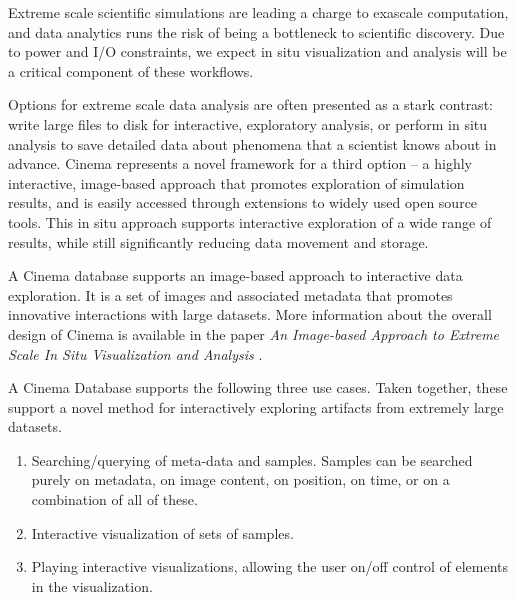 \label{sec:cinema}

Extreme scale scientific simulations are leading a charge to exascale computation, and data analytics runs the risk of being a bottleneck to scientific discovery. Due to power and I/O constraints, we expect in situ visualization and analysis will be a critical component of these workflows. 

Options for extreme scale data analysis are often presented as a stark contrast: write large files to disk for interactive, exploratory analysis, or perform in situ analysis to save detailed data about phenomena that a scientist knows about in advance. Cinema represents a novel framework for a third option – a highly interactive, image-based approach that promotes exploration of simulation results, and is easily accessed through extensions to widely used open source tools. This in situ approach supports interactive exploration of a wide range of results, while still significantly reducing data movement and storage.

A Cinema database supports an image-based approach to interactive data exploration. It is a set of images and associated metadata that promotes innovative interactions with large datasets. More information about the overall design of Cinema is available in the paper \textit{An Image-based Approach to Extreme Scale In Situ Visualization and Analysis} \cite{cinemaSC14}.

A Cinema Database supports the following three use cases. Taken together, these support a novel method for interactively exploring artifacts from extremely large datasets.

\begin{enumerate}
\item Searching/querying of meta-data and samples. Samples can be searched purely on metadata, on image content, on position, on time, or on a combination of all of these.
\item Interactive visualization of sets of samples.
\item Playing interactive visualizations, allowing the user on/off control of elements in the visualization.
\end{enumerate}

